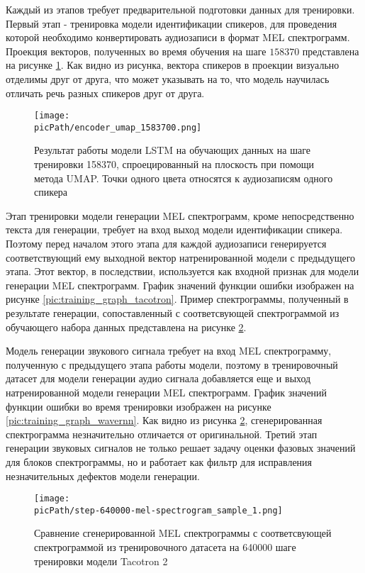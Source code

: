 \documentclass[oneside,final,14pt]{extreport}
\newcommand{\picPath}{pictures}
\begin{document}
Каждый из этапов требует предварительной подготовки данных для тренировки. Первый этап - тренировка модели идентификации спикеров, для проведения которой необходимо конвертировать аудиозаписи в формат MEL спектрограмм. Проекция векторов, полученных во время обучения на шаге $158370$ представлена на рисунке \ref{pic:umap_lstm}. Как видно из рисунка, вектора спикеров в проекции визуально отделимы друг от друга, что может указывать на то, что модель научилась отличать речь разных спикеров друг от друга.

\begin{figure}[H]
\begin{center}
\texttt{[image: \\picPath/encoder\_umap\_1583700.png]}
\end{center}
  \caption{Результат работы модели LSTM на обучающих данных на шаге тренировки 158370, спроецированный на плоскость при помощи метода UMAP\cite{bib:umap}. Точки одного цвета относятся к аудиозаписям одного спикера}
  \label{pic:umap_lstm}
\end{figure}


Этап тренировки модели генерации MEL спектрограмм, кроме непосредственно текста для генерации, требует на вход выход модели идентификации спикера. Поэтому перед началом этого этапа для каждой аудиозаписи генерируется соответствующий ему выходной вектор натренированной модели с предыдущего этапа. Этот вектор, в последствии, используется как входной признак для модели генерации MEL спектрограмм. График значений функции ошибки изображен на рисунке \ref{pic:training_graph_tacotron}. Пример спектрограммы, полученный в результате генерации, сопоставленный с соответсвующей спектрограммой из обучающего набора данных представлена на рисунке  \ref{pic:spectrogram_generated}. 


Модель генерации звукового сигнала требует на вход MEL спектрограмму, полученную с предыдущего этапа работы модели, поэтому в тренировочный датасет для модели генерации аудио сигнала добавляется еще и выход натренированной модели генерации MEL спектрограмм. График значений функции ошибки во время тренировки изображен на рисунке \ref{pic:training_graph_wavernn}. Как видно из рисунка \ref{pic:spectrogram_generated}, сгенерированная спектрограмма незначительно отличается от оригинальной. Третий этап генерации звуковых сигналов не только решает задачу оценки фазовых значений для блоков спектрограммы, но и работает как фильтр для исправления незначительных дефектов модели генерации.  

\begin{figure}[H]
\begin{center}
\texttt{[image: \\picPath/step-640000-mel-spectrogram\_sample\_1.png]}
\end{center}
  \caption{Сравнение сгенерированной MEL спектрограммы с соответсвующей спектрограммой из тренировочного датасета на 640000 шаге тренировки модели Tacotron 2}
  \label{pic:spectrogram_generated}
\end{figure}
\end{document}
